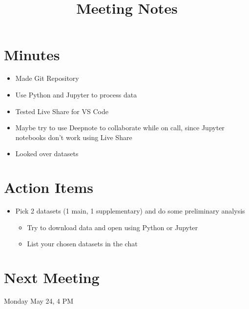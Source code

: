 \documentclass[12pt]{article}
\title{Meeting Notes}
\begin{document}
\maketitle

\section{Minutes}
\begin{itemize}
    \item Made Git Repository
    \item Use Python and Jupyter to process data
    \item Tested Live Share for VS Code
    \item Maybe try to use Deepnote to collaborate while on call, since Jupyter notebooks don't work using Live Share
    \item Looked over datasets
\end{itemize}


\section{Action Items}
\begin{itemize}
    \item Pick 2 datasets (1 main, 1 supplementary) and do some preliminary analysis 
    \begin{itemize}
        \item Try to download data and open using Python or Jupyter
        \item List your chosen datasets in the chat
    \end{itemize}
\end{itemize}

\section{Next Meeting}
Monday May 24, 4 PM
\end{document}

